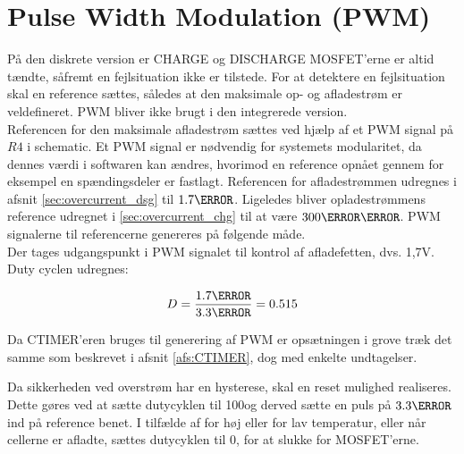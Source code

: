 \section{Pulse Width Modulation (PWM)}\label{afs:PWM}
På den diskrete version er CHARGE og DISCHARGE MOSFET'erne er altid tændte, såfremt en fejlsituation ikke er tilstede. For at detektere en fejlsituation skal en reference sættes, således at den maksimale op- og afladestrøm er veldefineret. PWM bliver ikke brugt i den integrerede version. \\

Referencen for den maksimale afladestrøm sættes ved hjælp af et PWM signal på $R4$ i schematic. Et PWM signal er nødvendig for systemets modularitet, da dennes værdi i softwaren kan ændres, hvorimod en reference opnået gennem for eksempel en spændingsdeler er fastlagt. Referencen for afladestrømmen udregnes i afsnit \ref{sec:overcurrent_dsg} til $1.7\volt$. Ligeledes bliver opladestrømmens reference udregnet i \ref{sec:overcurrent_chg} til at være $300\milli\volt$. PWM signalerne til referencerne genereres på følgende måde. \\

Der tages udgangspunkt i PWM signalet til kontrol af afladefetten, dvs. 1,7V. Duty cyclen udregnes: 

\begin {equation}
D = \frac{1.7\volt}{3.3\volt} = 0.515
\label{eq:duty}
\end {equation}

Da CTIMER'eren bruges til generering af PWM er opsætningen i grove træk det samme som beskrevet i afsnit \ref{afs:CTIMER}, dog med enkelte undtagelser. 


Da sikkerheden ved overstrøm har en hysterese, skal en reset mulighed realiseres. Dette gøres ved at sætte dutycyklen til 100\percent\space og derved sætte en puls på $3.3\volt$ ind på reference benet. I tilfælde af for høj eller for lav temperatur, eller når cellerne er afladte, sættes dutycyklen til 0\percent, for at slukke for MOSFET'erne.

